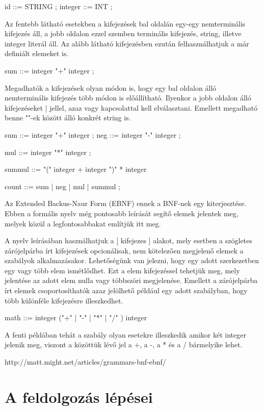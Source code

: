 id ::= 	STRING
	;
integer ::= INT
	;

Az fentebb látható esetekben a kifejezések bal oldalán egy-egy nemterminális kifejezés áll, a jobb oldalon ezzel szemben terminális kifejezés, string, illetve integer literál áll. Az alább látható kifejezésben ezután felhasználhatjuk a már definiált elemeket is.

sum ::=	integer "+" integer
	;

Megadhatók a kifejezések olyan módon is, hogy egy bal oldalon álló nemterminális kifejezés több módon is előállítható. Ilyenkor a jobb oldalon álló kifejezéseket | jellel, azaz vagy kapcsolattal kell elválasztani. Emellett megadható benne ""-ek között álló konkrét string is.

sum ::= integer "+" integer
	;
neg ::= integer "-" integer
	;
	
mul ::= integer "*" integer
	;

summul ::= "(" integer + integer ")" * integer

count ::= sum 
	| neg
	| mul
	| summul
	;
	
Az Extended Backus-Naur Form (EBNF) ennek a BNF-nek egy kiterjesztése. Ebben a formális nyelv még pontosabb leírását segítő elemek jelentek meg, melyek közül a legfontosabbakat említjük itt meg.

A nyelv leírásában használhatjuk a [ kifejezes ] alakot, mely esetben a szögletes zárójelpárba írt kifejezések opcionálisak, nem kötelezően megjelenő elemek a szabályok alkalmazásakor.
Lehetőségünk van jelezni, hogy egy adott szerkezetben egy vagy több elem ismétlődhet. Ezt a { elem } kifejezéssel tehetjük meg, mely jelentése az adott elem nulla vagy többszöri megjelenése.
Emellett a zárójelpárba írt elemek csoportosíthatók azaz jelölhető például egy adott szabályban, hogy több különféle kifejezésre illeszkedhet.

math ::= integer ("+" | "-" | "*" | "/" ) integer

A fenti példában tehát a szabály olyan esetekre illeszkedik amikor két integer jelenik meg, viszont a közöttük lévő jel a +, a -, a * és a / bármelyike lehet.

http://matt.might.net/articles/grammars-bnf-ebnf/


\section{A feldolgozás lépései}

